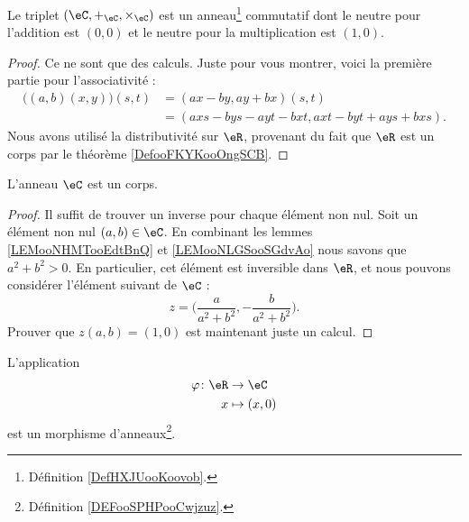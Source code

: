\begin{lemma}
	Le triplet \( (\eC,+_{\eC}, \times_{\eC})\) est un anneau\footnote{Définition \ref{DefHXJUooKoovob}.} commutatif dont le neutre pour l'addition est \( (0,0)\) et le neutre pour la multiplication est \( (1,0)\).
\end{lemma}

\begin{proof}
	Ce ne sont que des calculs. Juste pour vous montrer, voici la première partie pour l'associativité :
	\begin{subequations}
		\begin{align}
			\big( (a,b)(x,y) \big)(s,t) & =(ax-by,ay+bx)(s,t)                 \\
			                            & =(axs-bys-ayt-bxt,axt-byt+ays+bxs).
		\end{align}
	\end{subequations}
	Nous avons utilisé la distributivité sur \( \eR\), provenant du fait que \( \eR\) est un corps par le théorème \ref{DefooFKYKooOngSCB}.
\end{proof}

\begin{lemma}
	L'anneau \( \eC\) est un corps.
\end{lemma}

\begin{proof}
	Il suffit de trouver un inverse pour chaque élément non nul. Soit un élément non nul \( (a,b)\in \eC\). En combinant les lemmes \ref{LEMooNHMTooEdtBnQ} et \ref{LEMooNLGSooSGdvAo} nous savons que \( a^2+b^2>0\). En particulier, cet élément est inversible dans \( \eR\), et nous pouvons considérer l'élément suivant de \( \eC\) :
	\begin{equation}
		z=\big( \frac{ a }{ a^2+b^2 }, -\frac{ b }{ a^2+b^2 } \big).
	\end{equation}
	Prouver que \( z(a,b)=(1,0)\) est maintenant juste un calcul.
\end{proof}

\begin{lemma}
	L'application
	\begin{equation}
		\begin{aligned}
			\varphi\colon \eR & \to \eC       \\
			x                 & \mapsto (x,0)
		\end{aligned}
	\end{equation}
	est un morphisme d'anneaux\footnote{Définition \ref{DEFooSPHPooCwjzuz}.}.
\end{lemma}

